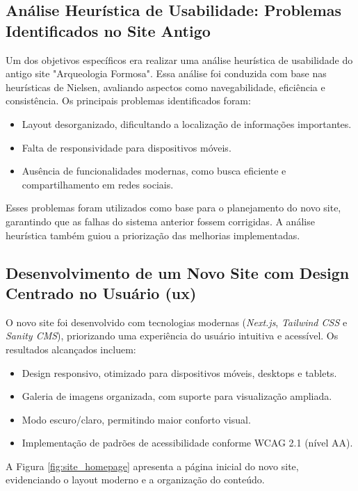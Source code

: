 \subsection{Análise Heurística de Usabilidade: Problemas Identificados no Site Antigo}
Um dos objetivos específicos era realizar uma análise heurística de usabilidade do antigo site "Arqueologia Formosa". Essa análise foi conduzida com base nas heurísticas de Nielsen, avaliando aspectos como navegabilidade, eficiência e consistência. Os principais problemas identificados foram:
\begin{itemize}
    \item Layout desorganizado, dificultando a localização de informações importantes.
    \item Falta de responsividade para dispositivos móveis.
    \item Ausência de funcionalidades modernas, como busca eficiente e compartilhamento em redes sociais.
\end{itemize}

Esses problemas foram utilizados como base para o planejamento do novo site, garantindo que as falhas do sistema anterior fossem corrigidas. A análise heurística também guiou a priorização das melhorias implementadas.

\subsection{Desenvolvimento de um Novo Site com Design Centrado no Usuário (\gls{ux})}
O novo site foi desenvolvido com tecnologias modernas (\textit{Next.js}, \textit{Tailwind CSS} e \textit{Sanity CMS}), priorizando uma experiência do usuário intuitiva e acessível. Os resultados alcançados incluem:
\begin{itemize}
    \item Design responsivo, otimizado para dispositivos móveis, desktops e tablets.
    \item Galeria de imagens organizada, com suporte para visualização ampliada.
    \item Modo escuro/claro, permitindo maior conforto visual.
    \item Implementação de padrões de acessibilidade conforme WCAG 2.1 (nível AA).
\end{itemize}

A Figura \ref{fig:site_homepage} apresenta a página inicial do novo site, evidenciando o layout moderno e a organização do conteúdo.

